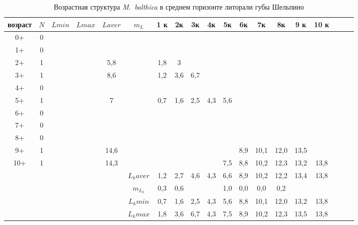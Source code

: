 \begin{landscape}
\begin{table}[h]
\caption{Возрастная структура {\it M.~balthica} в среднем горизонте литорали губы Шельпино}
\label{tab:Shelpino_sgl_growth_matrix}
\begin{tabular}{|c|c|cc|cc|ccccccccccccc|}
    \hline
возраст & $N$ & $L min$ & $L max$ & $L aver$ & $m_L$   & 1 к & 2к  & 3к  & 4к       & 5к  & 6к  & 7к   & 8к   & 9 к  & 10 к &  &  &  \\ \hline
0+      & 0 &       &       &         &         &     &     &     &          &     &     &      &      &      &      &  &  &  \\
1+      & 0 &       &       &         &         &     &     &     &          &     &     &      &      &      &      &  &  &  \\
2+      & 1 &       &       & 5,8     &         & 1,8 & 3   &     &          &     &     &      &      &      &      &  &  &  \\
3+      & 1 &       &       & 8,6     &         & 1,2 & 3,6 & 6,7 &          &     &     &      &      &      &      &  &  &  \\
4+      & 0 &       &       &         &         &     &     &     &          &     &     &      &      &      &      &  &  &  \\
5+      & 1 &       &       & 7       &         & 0,7 & 1,6 & 2,5 & 4,3      & 5,6 &     &      &      &      &      &  &  &  \\
6+      & 0 &       &       &         &         &     &     &     &          &     &     &      &      &      &      &  &  &  \\
7+      & 0 &       &       &         &         &     &     &     &          &     &     &      &      &      &      &  &  &  \\
8+      & 0 &       &       &         &         &     &     &     &          &     &     &      &      &      &      &  &  &  \\
9+      & 1 &       &       & 14,6    &         &     &     &     &          &     & 8,9 & 10,1 & 12,0 & 13,5 &      &  &  &  \\
10+     & 1 &       &       & 14,3    &         &     &     &     &          & 7,5 & 8,8 & 10,2 & 12,3 & 13,2 & 13,8 &  &  &  \\ \hline
        &   &       &       &         & $L_k aver$ & 1,2 & 2,7 & 4,6 & 4,3      & 6,6 & 8,9 & 10,2 & 12,2 & 13,4 & 13,8 &  &  &  \\
        &   &       &       &         & $m_{L_k}$  & 0,3 & 0,6 &     &       & 1,0 & 0,0 & 0,0  & 0,2  &      &      &  &  &  \\
        &   &       &       &         & $L_k min$  & 0,7 & 1,6 & 2,5 & 4,3      & 5,6 & 8,8 & 10,1 & 12,0 & 13,2 & 13,8 &  &  &  \\
        &   &       &       &         & $L_k max$  & 1,8 & 3,6 & 6,7 & 4,3      & 7,5 & 8,9 & 10,2 & 12,3 & 13,5 & 13,8 &  &  &  \\ \hline
\end{tabular}
\end{table}


\end{landscape}
